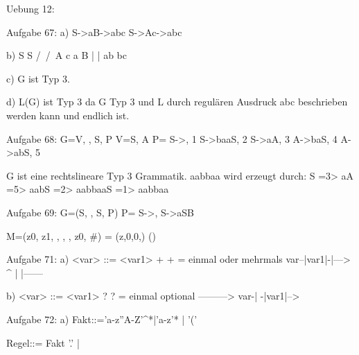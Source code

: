 Uebung 12:

Aufgabe 67:
a)
S->aB->abc
S->Ac->abc

b)
  S		S
  /\	/\
  A c	a B
  |		  |
 ab		  bc
 
c)
G ist Typ 3.

d)
L(G) ist Typ 3 da G Typ 3 und L
durch regulären Ausdruck abc beschrieben werden kann und endlich ist.


Aufgabe 68:
G={V, \sigma, S, P}
V={S, A}
P={
S->\epsilon,	1
S->baaS,		2
S->aA,			3
A->baS,			4
A->abS,			5
}

G ist eine rechtslineare Typ 3 Grammatik.
aabbaa wird erzeugt durch:
S =3> aA =5> aabS =2> aabbaaS =1> aabbaa


Aufgabe 69:
G=(S, \Sigma, S, P)
P={
S->\epsilon,
S->aSB
}

M=({z0, z1}, \Sigma, \Gamma, \Delta, z0, #)
\Delta ={
(z,0,0,\epsilon)
()
}


Aufgabe 71:
a) <var> ::= <var1> +
+ = einmal oder mehrmals
var--|var1|-|--->
	 ^		|
	 |------

b) <var> ::= <var1> ?
? = einmal optional
	 --------->
var-|
     -|var1|-->


Aufgabe 72:
a)
Fakt::='a-z''A-Z'^*|'a-z'* | '(' 

Regel::= Fakt '.' | 